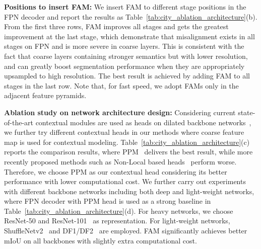 \noindent
\textbf{Positions to insert FAM:} We insert FAM to different stage positions in the FPN decoder and report the results as Table~\ref{tab:city_ablation_architecture}(b). From the first three rows, FAM improves all stages and gets the greatest improvement at the last stage, which demonstrate that misalignment exists in all stages on FPN and is more severe in coarse layers. This is consistent with the fact that coarse layers containing stronger semantics but with lower resolution, and can greatly boost segmentation performance when they are appropriately upsampled to high resolution. The best result is achieved by adding FAM to all stages in the last row. Note that, for fast speed, we adopt FAMs only in the adjacent feature pyramids.

\noindent
\textbf{Ablation study on network architecture design: } \label{sec:ablation}
Considering current state-of-the-art contextual modules are used as heads on dilated backbone networks~\cite{deeplabv3, Co-Occurrent, DAnet, pspnet, psanet, denseaspp}, we further try different contextual heads in our methods where coarse feature map is used for contextual modeling. Table~\ref{tab:city_ablation_architecture}(c) reports the comparison results, where PPM~\cite{pspnet} delivers the best result, while more recently proposed methods such as Non-Local based heads~\cite{non_local} perform worse. Therefore, we choose PPM as our contextual head considering its better performance with lower computational cost. We further carry out experiments with different backbone networks including both deep and light-weight networks, where FPN decoder with PPM head is used as a strong baseline in Table~\ref{tab:city_ablation_architecture}(d). For heavy networks, we choose ResNet-50 and ResNet-101~\cite{resnet} as representation. For light-weight networks, ShuffleNetv2~\cite{shufflenetv2} and DF1/DF2~\cite{DF-seg-net} are employed. FAM significantly achieves better mIoU on all backbones with slightly extra computational cost.

